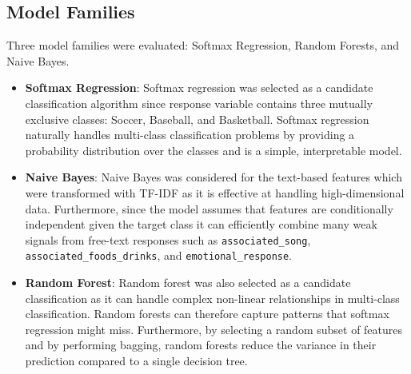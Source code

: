 \documentclass[12pt]{article}
\begin{document}
\subsection*{Model Families} 
Three model families were evaluated: Softmax Regression, Random Forests, and Naive Bayes.
\begin{itemize} 
    \item \textbf{Softmax Regression}: Softmax regression was selected as a candidate classification algorithm since response variable contains three mutually exclusive classes: Soccer, Baseball, and Basketball. Softmax regression naturally handles multi-class classification problems by providing a probability distribution over the classes and is a simple, interpretable model. 
    \item \textbf{Naive Bayes}: Naive Bayes was considered for the text-based features which were transformed with TF-IDF as it is effective at handling high-dimensional data. Furthermore, since the model assumes that features are conditionally independent given the target class it can efficiently combine many weak signals from free-text responses such as \texttt{associated\_song}, \texttt{associated\_foods\_drinks}, and \texttt{emotional\_response}. 
    \item \textbf{Random Forest}: Random forest was also selected as a candidate classification as it can handle complex non-linear relationships in multi-class classification. Random forests can therefore capture patterns that softmax regression might miss. Furthermore, by selecting a random subset of features and by performing bagging, random forests reduce the variance in their prediction compared to a single decision tree.
\end{itemize} 
\end{document}
